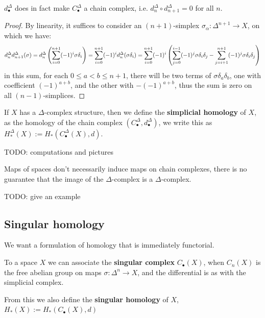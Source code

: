 \documentclass{article}
\begin{document}
\begin{proposition}
    $d_\bullet^\Delta$ does in fact make $C_\bullet^\Delta$ a chain complex, i.e. $d_n^\Delta\circ d_{n+1}^\Delta=0$ for all $n$.
    \begin{proof}
        By linearity, it suffices to consider an $(n+1)$-simplex $\sigma_\alpha:\Delta^{n+1}\rightarrow X$, on which we have: \[
        d_n^\Delta d_{n+1}^\Delta(\sigma) = d_n^\Delta\left( \sum_{i=0}^{n+1}(-1)^i\sigma\delta_i \right) = \sum_{i=0}^{n+1}(-1)^id_n^\Delta(\sigma\delta_i)
        = \sum_{i=0}^{n+1}(-1)^i\left( \sum_{j=0}^{i-1}(-1)^{j}\sigma\delta_i\delta_j -
        \sum_{j=i+1}^{n+1}(-1)^{j}\sigma\delta_i\delta_j \right)
        \] in this sum, for each $0\leq a < b \leq n+1$, there will be two terms of $\sigma\delta_a\delta_b$, one with coefficient $(-1)^{a+b}$, and the other with $-(-1)^{a+b}$, thus the sum is zero on all $(n-1)$-simplices.
    \end{proof}
\end{proposition}



\begin{definition}
    If $X$ has a $\Delta$-complex structure, then we define the \textbf{simplicial homology} of $X$, as the homology of the chain complex $(C_\bullet^\Delta,d_\bullet^\Delta)$, we write this as $H_*^\Delta(X):= H_*(C^\Delta_\bullet(X),d)$.
\end{definition}

TODO: computations and pictures

Maps of spaces don't necessarily induce maps on chain complexes, there is no guarantee that the image of the $\Delta$-complex is a $\Delta$-complex.

TODO: give an example

\subsection{Singular homology}

We want a formulation of homology that is immediately functorial.

\begin{definition}
    To a space $X$ we can associate the \textbf{singular complex} $C_\bullet(X)$, when $C_n(X)$ is the free abelian group on maps $\sigma:\Delta^n\rightarrow X$, and the differential is as with the simplicial complex.

    From this we also define the \textbf{singular homology} of $X$, $H_*(X) := H_*(C_\bullet(X),d)$
\end{definition}
\end{document}
